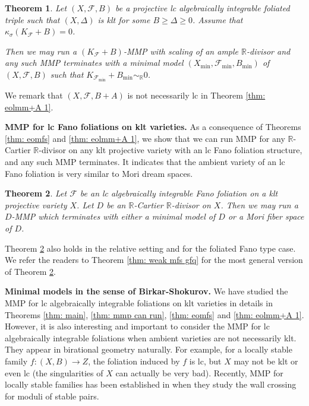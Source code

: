 \documentclass[11pt]{amsart}
\numberwithin{equation}{section}
\newcommand{\Rr}{\mathbb{R}}
\newcommand{\Ff}{\mathcal{F}}
\newtheorem{thm}{Theorem}[section]
\theoremstyle{definition}
\theoremstyle{definition}
\theoremstyle{definition}
\begin{document}
\begin{thm}\label{thm: nt eogmm}
    Let $(X,\Ff,B)$ be a projective lc algebraically integrable foliated triple such that $(X,\Delta)$ is klt for some $B\geq\Delta\geq 0$. Assume that $\kappa_{\sigma}(K_{\Ff}+B)=0$.

    Then we may run a $(K_{\Ff}+B)$-MMP with scaling of an ample $\Rr$-divisor and any such MMP terminates with a minimal model $(X_{\min},\Ff_{\min},B_{\min})$ of $(X,\Ff,B)$ such that $K_{\Ff_{\min}}+B_{\min}\sim_{\mathbb R}0$.
\end{thm}

We remark that $(X,\Ff,B+A)$ is not necessarily lc in Theorem \ref{thm: eolmm+A 1}.



\medskip

\noindent\textbf{MMP for lc Fano foliations on klt varieties.} As a consequence of Theorems \ref{thm: eomfs} and \ref{thm: eolmm+A 1}, we show that we can run MMP for any $\Rr$-Cartier $\Rr$-divisor on any klt projective variety with an lc Fano foliation structure, and any such MMP terminates. It indicates that the ambient variety of an lc Fano foliation is very similar to Mori dream spaces.

\begin{thm}\label{thm: weak mfs}
Let $\Ff$ be an lc algebraically integrable Fano foliation on a klt projective variety $X$. Let $D$ be an  $\Rr$-Cartier $\Rr$-divisor on $X$. Then we may run a $D$-MMP which terminates with either a minimal model of $D$ or a Mori fiber space of $D$.
\end{thm}

Theorem \ref{thm: weak mfs} also holds in the relative setting and for the foliated Fano type case. We refer the readers to Theorem \ref{thm: weak mfs gfq} for the most general version of Theorem \ref{thm: weak mfs}.

\medskip

\noindent\textbf{Minimal models in the sense of Birkar-Shokurov.} We have studied the MMP for lc algebraically integrable foliations on klt varieties in details in Theorems \ref{thm: main}, \ref{thm: mmp can run}, \ref{thm: eomfs} and \ref{thm: eolmm+A 1}. However, it is also interesting and important to consider the MMP for lc algebraically integrable foliations when ambient varieties are not necessarily klt. They appear in birational geometry naturally. For example, for a locally stable family $f: (X, B)\rightarrow Z$, the foliation induced by $f$ is lc, but $X$ may not be klt or even lc (the singularities of $X$ can actually be very bad). Recently, MMP for locally stable families has been established in \cite{MZ23} when they study the wall crossing for moduli of stable pairs.
\end{document}
